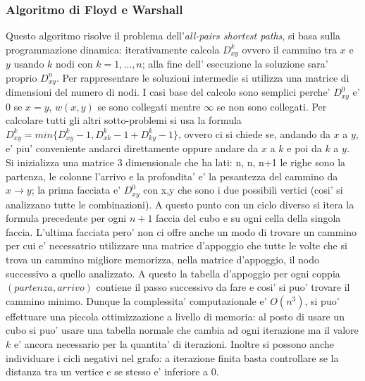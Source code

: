 \documentclass{article}
\begin{document}
\subsubsection{Algoritmo di Floyd e Warshall}
Questo algoritmo risolve il problema dell'\textit{all-pairs shortest paths}, si basa sulla programmazione dinamica: iterativamente calcola $D_{xy}^k$ ovvero il cammino tra $x$ e $y$ usando $k$ nodi con $k=1,...,n$; 
alla fine dell' esecuzione la soluzione sara' proprio $D_{xy}^n$. Per rappresentare le soluzioni intermedie si utilizza una matrice di dimensioni del numero di nodi.
I casi base del calcolo sono semplici perche' $D_{xy}^0$ e' $0$ se $x=y$, $w(x,y)$ se sono collegati mentre $\infty$ se non sono collegati.
Per calcolare tutti gli altri sotto-problemi si usa la formula $D_{xy}^k = min\{D_{xy}^k-1, D_{xk}^k-1 + D_{ky}^k-1\}$, ovvero ci si chiede se, andando da $x$ a $y$, e' piu' conveniente andarci direttamente oppure andare da $x$ a $k$ e poi da $k$ a $y$.
Si inizializza una matrice 3 dimensionale che ha lati: n, n, n+1 le righe sono la partenza, le colonne l'arrivo e la profondita' e' la pesantezza del cammino da $x \rightarrow y$; 
la prima facciata e' $D_{xy}^0$ con x,y che sono i due possibili vertici (cosi' si analizzano tutte le combinazioni).
 A questo punto con un ciclo diverso si itera la formula precedente per ogni $n + 1$ faccia del cubo e su ogni cella della singola faccia.
L'ultima facciata pero' non ci offre anche un modo di trovare un cammino per cui e' necessatrio utilizzare una matrice d'appoggio che tutte le volte che si trova un cammino migliore memorizza, nella matrice d'appoggio, il nodo successivo a quello analizzato.
A questo la tabella d'appoggio per ogni coppia $(partenza, arrivo)$ contiene il passo successivo da fare e cosi' si puo' trovare il cammino minimo.
Dunque la complessita' computazionale e' $O(n^3)$, si puo' effettuare una piccola ottimizzazione a livello di memoria: al posto di usare un cubo si puo' usare una tabella normale che cambia ad ogni iterazione ma il valore $k$ e' ancora necessario per la quantita' di iterazioni.
Inoltre si possono anche individuare i cicli negativi nel grafo: a iterazione finita basta controllare se la distanza tra un vertice e se stesso e' inferiore a 0.
\end{document}
